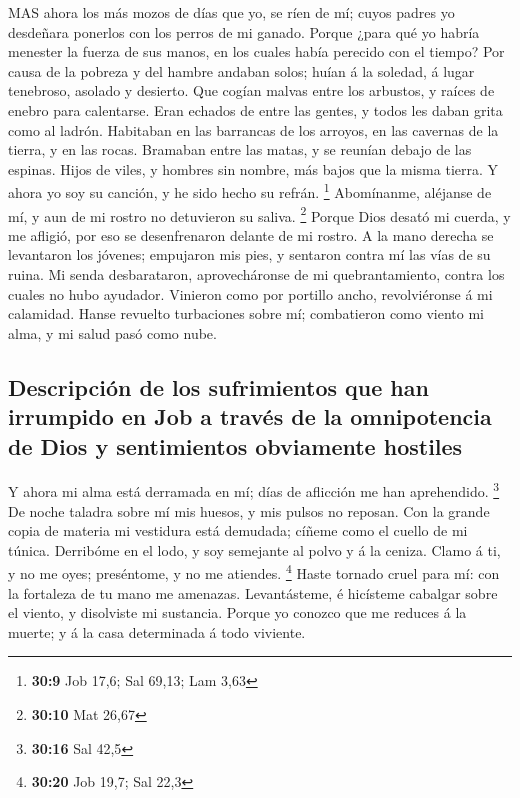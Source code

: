  MAS ahora los más mozos de días que yo, se ríen de mí;
cuyos padres yo desdeñara ponerlos con los perros de mi ganado.
 Porque ¿para qué yo habría menester la fuerza de sus manos,
en los cuales había perecido con el tiempo?  Por causa de la
pobreza y del hambre andaban solos; huían á la soledad, á lugar
tenebroso, asolado y desierto.  Que cogían malvas entre los
arbustos, y raíces de enebro para calentarse.  Eran echados
de entre las gentes, y todos les daban grita como al ladrón.
 Habitaban en las barrancas de los arroyos, en las cavernas
de la tierra, y en las rocas.  Bramaban entre las matas, y
se reunían debajo de las espinas.  Hijos de viles, y hombres
sin nombre, más bajos que la misma tierra.  Y ahora yo soy
su canción, y he sido hecho su refrán. \footnote{\textbf{30:9} Job 17,6;
  Sal 69,13; Lam 3,63}  Abomínanme, aléjanse de mí, y aun
de mi rostro no detuvieron su saliva. \footnote{\textbf{30:10} Mat 26,67}
 Porque Dios desató mi cuerda, y me afligió, por eso se
desenfrenaron delante de mi rostro.  A la mano derecha se
levantaron los jóvenes; empujaron mis pies, y sentaron contra mí las
vías de su ruina.  Mi senda desbarataron, aprovecháronse de
mi quebrantamiento, contra los cuales no hubo ayudador. 
Vinieron como por portillo ancho, revolviéronse á mi calamidad.
 Hanse revuelto turbaciones sobre mí; combatieron como
viento mi alma, y mi salud pasó como nube.

\hypertarget{descripciuxf3n-de-los-sufrimientos-que-han-irrumpido-en-job-a-travuxe9s-de-la-omnipotencia-de-dios-y-sentimientos-obviamente-hostiles}{%
\subsection{Descripción de los sufrimientos que han irrumpido en Job a
través de la omnipotencia de Dios y sentimientos obviamente
hostiles}\label{descripciuxf3n-de-los-sufrimientos-que-han-irrumpido-en-job-a-travuxe9s-de-la-omnipotencia-de-dios-y-sentimientos-obviamente-hostiles}}

 Y ahora mi alma está derramada en mí; días de aflicción me
han aprehendido. \footnote{\textbf{30:16} Sal 42,5}  De
noche taladra sobre mí mis huesos, y mis pulsos no reposan.
 Con la grande copia de materia mi vestidura está demudada;
cíñeme como el cuello de mi túnica.  Derribóme en el lodo,
y soy semejante al polvo y á la ceniza.  Clamo á ti, y no
me oyes; preséntome, y no me atiendes. \footnote{\textbf{30:20} Job
  19,7; Sal 22,3}  Haste tornado cruel para mí: con la
fortaleza de tu mano me amenazas.  Levantásteme, é
hicísteme cabalgar sobre el viento, y disolviste mi sustancia.
 Porque yo conozco que me reduces á la muerte; y á la casa
determinada á todo viviente.

